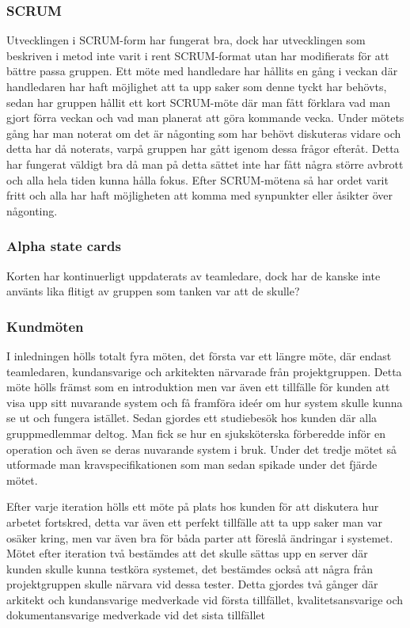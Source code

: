 \subsubsection{SCRUM}
Utvecklingen i SCRUM-form har fungerat bra,
dock har utvecklingen som beskriven i metod inte varit i rent SCRUM-format utan har modifierats för att bättre passa gruppen.
Ett möte med handledare har hållits en gång i veckan där handledaren har haft möjlighet att ta upp saker som denne tyckt har behövts,
sedan har gruppen hållit ett kort SCRUM-möte där man fått förklara vad man gjort förra veckan och vad man planerat
att göra kommande vecka. Under mötets gång har man noterat om det är någonting som har behövt diskuteras
vidare och detta har då noterats, varpå gruppen har gått igenom dessa frågor efteråt. Detta har fungerat väldigt bra då man på detta sättet inte har fått några större avbrott och alla hela tiden kunna hålla fokus. Efter SCRUM-mötena så har ordet varit fritt och alla har haft möjligheten att komma med synpunkter eller åsikter över någonting.

\subsubsection{Alpha state cards}
Korten har kontinuerligt uppdaterats av teamledare, dock har de kanske inte använts lika flitigt av gruppen som tanken var att de skulle?

\subsubsection{Kundmöten}
I inledningen hölls totalt fyra möten, det första var ett längre möte, där endast teamledaren, kundansvarige och arkitekten närvarade från projektgruppen. Detta möte hölls främst som en introduktion men var även ett tillfälle för kunden att visa upp sitt nuvarande system och få framföra ideér om hur system skulle kunna se ut och fungera istället. Sedan gjordes ett studiebesök hos kunden där alla gruppmedlemmar deltog. Man fick se hur en sjuksköterska förberedde inför en operation och även se deras nuvarande system i bruk. Under det tredje mötet så utformade man kravspecifikationen som man sedan spikade under det fjärde mötet.

Efter varje iteration hölls ett möte på plats hos kunden för att diskutera hur arbetet fortskred, detta var även ett perfekt tillfälle att ta upp saker man var osäker kring, men var även bra för båda parter att föreslå ändringar i systemet. Mötet efter iteration två bestämdes att det skulle sättas upp en server där kunden skulle kunna testköra systemet, det bestämdes också att några från projektgruppen skulle närvara vid dessa tester. Detta gjordes två gånger där arkitekt och kundansvarige medverkade vid första tillfället, kvalitetsansvarige och dokumentansvarige medverkade vid det sista tillfället

